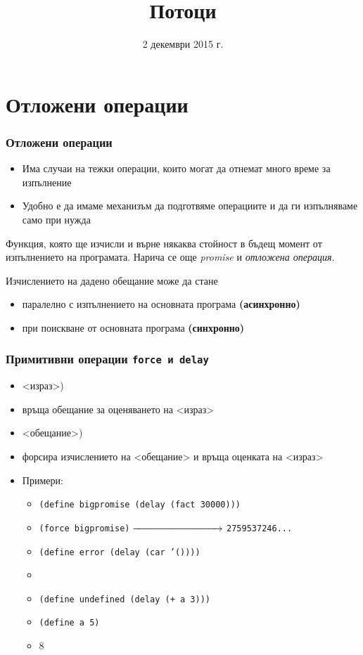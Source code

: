 \documentclass{beamer}
\title{Потоци}
\date{2 декември 2015 г.}
\begin{document}
\begin{frame}
  \titlepage
\end{frame}

\section{Отложени операции}

\begin{frame}
  \frametitle{Отложени операции}
  \begin{itemize}[<+->]
  \item Има случаи на тежки операции, които могат да отнемат много време за изпълнение
  \item Удобно е да имаме механизъм да \alert{подготвяме} операциите и да ги \alert{изпълняваме} само при нужда
  \end{itemize}
  \onslide<+->
  \begin{definition}[Обещание]
    Функция, която ще изчисли и върне някаква стойност в бъдещ момент от изпълнението на програмата.
    \onslide<+->
    Нарича се още \emph{promise} и \emph{отложена операция}.
  \end{definition}
  \onslide<+->
  Изчислението на дадено обещание може да стане
  \begin{itemize}[<+->]
  \item паралелно с изпълнението на основната програма \textbf{(асинхронно)}
  \item при поискване от основната програма \textbf{(синхронно)}
  \end{itemize}
\end{frame}

\begin{frame}
  \frametitle{Примитивни операции \tt{force} и \tt{delay}}
  \begin{itemize}[<+->]
  \item {}<израз>\tta)
  \item връща \alert{обещание} за оценяването на <израз> 
  \item {}<обещание>\tta)
  \item форсира изчислението на <обещание> и връща оценката на <израз> 
    \pause
  \item Примери:
    \begin{itemize}
    \item \tt{(define bigpromise (delay (fact 30000)))}
    \item \tt{(force bigpromise)}$\;\xrightarrow{\hspace*{3cm}}\;$\tt{2759537246...}
    \item \tt{(define error (delay (car '())))}
    \item {}
    \item \tt{(define undefined (delay (+ a 3)))}
    \item \tt{(define a 5)}
    \item {}8
    \end{itemize}
  \end{itemize}
\end{frame}
\end{document}
